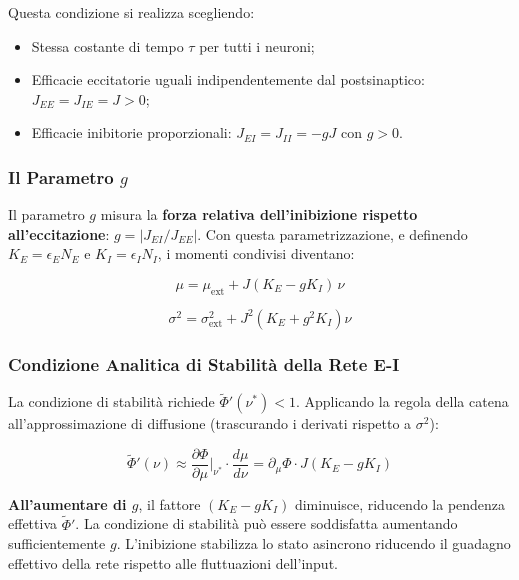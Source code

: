 Questa condizione si realizza scegliendo:
\begin{itemize}
    \item Stessa costante di tempo $\tau$ per tutti i neuroni;
    \item Efficacie eccitatorie uguali indipendentemente dal postsinaptico: $J_{EE} = J_{IE} = J > 0$;
    \item Efficacie inibitorie proporzionali: $J_{EI} = J_{II} = -gJ$ con $g > 0$.
\end{itemize}

\subsubsection{Il Parametro $g$}

Il parametro $g$ misura la \textbf{forza relativa dell'inibizione rispetto all'eccitazione}: $g = |J_{EI}/J_{EE}|$. Con questa parametrizzazione, e definendo $K_E = \epsilon_E N_E$ e $K_I = \epsilon_I N_I$, i momenti condivisi diventano:

\begin{equation}
\mu = \mu_{\text{ext}} + J(K_E - g K_I)\,\nu
\end{equation}

\begin{equation}
\sigma^2 = \sigma_{\text{ext}}^2 + J^2(K_E + g^2 K_I)\nu
\end{equation}

\subsubsection{Condizione Analitica di Stabilità della Rete E-I}

La condizione di stabilità richiede $\tilde{\Phi}'(\nu^*) < 1$. Applicando la regola della catena all'approssimazione di diffusione (trascurando i derivati rispetto a $\sigma^2$):

\begin{equation}
\tilde{\Phi}'(\nu) \approx \frac{\partial \Phi}{\partial \mu}\bigg|_{\nu^*} \cdot \frac{d\mu}{d\nu} = \partial_\mu\Phi \cdot J(K_E - gK_I)
\end{equation}

\textbf{All'aumentare di $g$}, il fattore $(K_E - gK_I)$ diminuisce, riducendo la pendenza effettiva $\tilde{\Phi}'$. La condizione di stabilità può essere soddisfatta aumentando sufficientemente $g$. L'inibizione stabilizza lo stato asincrono riducendo il guadagno effettivo della rete rispetto alle fluttuazioni dell'input.

